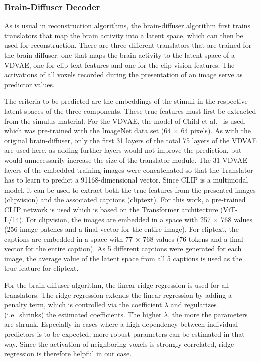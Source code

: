 \subsubsection{Brain-Diffuser Decoder}
As is usual in reconstruction algorithms, the brain-diffuser algorithm first trains translators that map the brain activity into a latent space, which can then be used for reconstruction. There are three different translators that are trained for the brain-diffuser: one that maps the brain activity to the latent space of a VDVAE, one for clip text features and one for the clip vision features. The activations of all voxels recorded during the presentation of an image serve as predictor values.  

The criteria to be predicted are the embeddings of the stimuli in the respective latent spaces of the three components. These true features must first be extracted from the simulus material. For the VDVAE, the model of Child et al.\ \cite{childVeryDeepVAEs2020} is used, which was pre-trained with the ImageNet data set (64 $\times$ 64 pixels). As with the original brain-diffuser, only the first 31 layers of the total 75 layers of the VDVAE are used here, as adding further layers would not improve the prediction, but would unnecessarily increase the size of the translator module. The 31 VDVAE layers of the embedded training images were concatenated so that the Translator has to learn to predict a 91168-dimensional vector. 
Since CLIP\cite{radfordLearningTransferableVisual2021} is a multimodal model, it can be used to extract both the true features from the presented images (clipvision) and the associated captions (cliptext). For this work, a pre-trained CLIP network is used which is based on the Transformer architecture (ViT-L/14). For clipvision, the images are embedded in a space with 257 $\times$ 768 values (256 image patches and a final vector for the entire image). For cliptext, the captions are embedded in a space with 77 $\times$ 768 values (76 tokens and a final vector for the entire caption). As 5 different captions were generated for each image, the average value of the latent space from all 5 captions is used as the true feature for cliptext.


For the brain-diffuser algorithm, the linear ridge regression\cite{hoerlRidgeRegressionBiased1970} is used for all translators. The ridge regression extends the linear regression by adding a penalty term, which is controlled via the coefficient $\lambda$ and regularizes (i.e.\ shrinks) the estimated coefficients. The higher $\lambda$, the more the parameters are shrunk. Especially in cases where a high dependency between individual predictors is to be expected, more robust parameters can be estimated in that way. Since the activation of neighboring voxels is strongly correlated, ridge regression is therefore helpful in our case.

